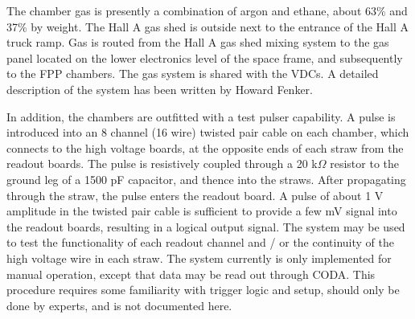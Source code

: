 {The chamber gas is presently a combination of argon and ethane,
about 63\% and 37\% by weight. The Hall A gas shed is outside
next to the entrance of the Hall A truck ramp.
Gas is routed from the Hall A gas shed mixing system to the gas panel
located on the lower electronics level of the space frame, and subsequently
to the FPP chambers.
The gas system is shared with the VDCs.
A detailed description of the system has been written by
Howard Fenker.

In addition, the chambers are outfitted with a test pulser capability.
A pulse is introduced into an 8 channel (16 wire) twisted pair cable
on each chamber, which connects to the high voltage boards,
at the opposite ends of each straw from the readout boards.
The pulse is resistively coupled through a 20 k$\Omega$ resistor
to the ground leg of a 1500 pF capacitor, and thence into the
straws.
After propagating through the straw, the pulse enters the readout board.
A pulse of about 1 V amplitude in the twisted pair cable is sufficient to
provide a few mV signal into the readout boards, resulting in a logical
output signal.
The system may be used to test the functionality of each readout channel
and / or the continuity of the high voltage wire in each straw.
The system currently is only implemented for manual operation, except
that data may be read out through CODA.
This procedure requires some familiarity with trigger logic and setup,
should only be done by experts, and is not documented here.
} %

